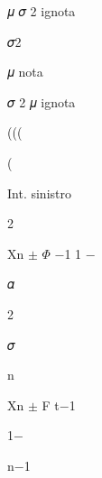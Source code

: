 \documentclass[a4paper,portrait,12pt]{article}
\begin{document}
\begin{flushleft}
𝜇 𝜎 2 ignota
\end{flushleft}


\begin{flushleft}
𝜎2
\end{flushleft}





\begin{flushleft}
𝜇 nota
\end{flushleft}





\begin{flushleft}
𝜎 2 𝜇 ignota
\end{flushleft}





(((


(





\begin{flushleft}
Int. sinistro
\end{flushleft}


2





\begin{flushleft}
Xn $\pm$ $\Phi$ $-$1 1 $-$
\end{flushleft}





\begin{flushleft}
𝛼
\end{flushleft}


2





\begin{flushleft}
𝜎
\end{flushleft}


\begin{flushleft}
n
\end{flushleft}





\begin{flushleft}
Xn $\pm$ F t$-$1
\end{flushleft}


1$-$


\begin{flushleft}
n$-$1
\end{flushleft}
\end{document}
